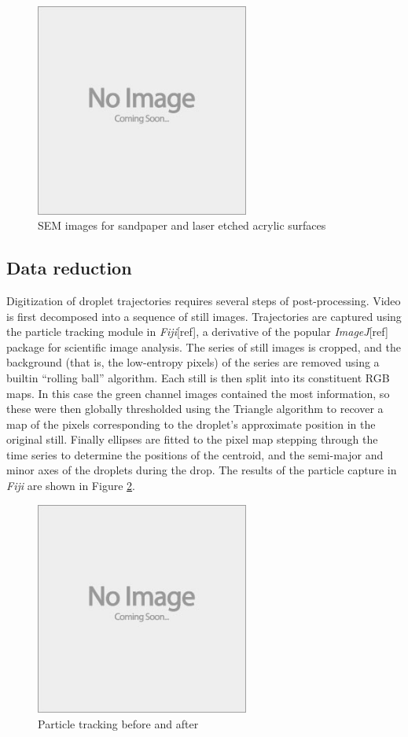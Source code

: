 \documentclass{jfm}
\begin{document}
\begin{figure}
  \centerline{\includegraphics[height=7cm,width=7cm]{e88_1_thumb.jpg}}
  \caption{SEM images for sandpaper and laser etched acrylic surfaces}
\label{fig:SEM}
\end{figure}


\subsection{Data reduction}
Digitization of droplet trajectories requires several steps of post-processing. Video is first decomposed into a sequence of still images. Trajectories are captured using the particle tracking module in \emph{Fiji}[ref], a derivative of the popular \emph{ImageJ}[ref] package for scientific image analysis. The series of still images is cropped, and the background (that is, the low-entropy pixels) of the series are removed using a builtin ``rolling ball'' algorithm.  Each still is then split into its constituent RGB maps. In this case the green channel images contained the most information, so these were then globally thresholded using the Triangle algorithm to recover a map of the pixels corresponding to the droplet's approximate position in the original still. Finally ellipses are fitted to the pixel map stepping through the time series to determine the positions of the centroid, and the semi-major and minor axes of the droplets during the drop. The results of the particle capture in \emph{Fiji} are shown in Figure \ref{fig:fiji}.

\begin{figure}
  \centerline{\includegraphics[height=7cm,width=7cm]{e88_1_thumb.jpg}}
  \caption{Particle tracking before and after}
\label{fig:fiji}
\end{figure}  
\end{document}
